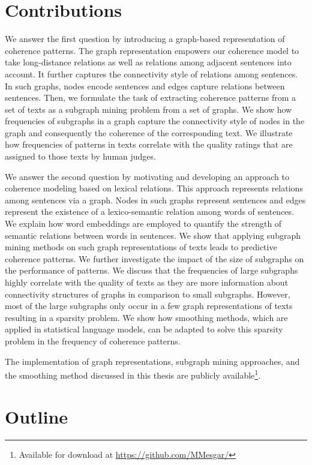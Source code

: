 \section{Contributions}
\label{sec:intro-contributions}

We answer the first question by introducing a graph-based representation of coherence patterns. 
The graph representation empowers our coherence model to take long-distance relations as well as relations among adjacent sentences into account. 
It further captures the connectivity style of relations among sentences. 
In such graphs, nodes encode sentences and edges capture relations between sentences. 
Then, we formulate the task of extracting coherence patterns from a set of texts as a subgraph mining problem from a set of graphs. 
We show how frequencies of subgraphs in a graph capture the connectivity style of nodes in the graph and consequently the coherence of the corresponding text. 
We illustrate how frequencies of patterns in texts correlate with the quality ratings that are assigned to those texts by human judges. 

We answer the second question by motivating and developing an approach to coherence modeling based on lexical relations. 
This approach represents relations among sentences via a graph. 
Nodes in such graphs represent sentences and edges represent the existence of a lexico-semantic relation among words of sentences. 
We explain how word embeddings are employed to quantify the strength of semantic relations between words in sentences. 
We show that applying subgraph mining methods on such graph representations of texts leads to predictive coherence patterns.   
We further investigate the impact of the size of subgraphs on the performance of patterns. 
We discuss that the frequencies of large subgraphs highly correlate with the quality of texts as they are more information about connectivity structures of graphs in comparison to small subgraphs.
However, most of the large subgraphs only occur in a few graph representations of texts resulting in a sparsity problem.  
We show how smoothing methods, which are applied in statistical language models, can be adapted to solve this sparsity problem in the frequency of coherence patterns. 

The implementation of graph representations, subgraph mining approaches, and the smoothing method discussed in this thesis are publicly available\footnote{Available for download at \url{https://github.com/MMesgar/}}. 

\section{Outline}
\label{sec:intro-outline} 

